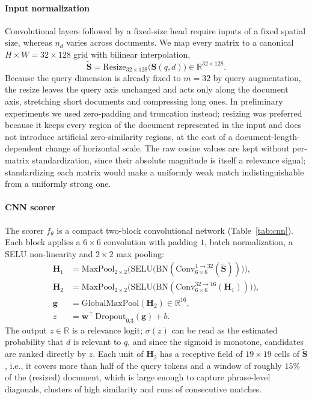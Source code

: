 \documentclass[preprint,5p,times,twocolumn,authoryear]{elsarticle}
\begin{document}
\paragraph{Input normalization}
Convolutional layers followed by a fixed-size head require inputs of a fixed spatial size, whereas $n_d$ varies across documents. We map every matrix to a canonical $H\times W = 32\times128$ grid with bilinear interpolation,
\begin{equation}
\tilde{\mathbf{S}} = \mathrm{Resize}_{32\times128}\big(\mathbf{S}(q,d)\big) \in \mathbb{R}^{32\times128}.
\label{eq:resize}
\end{equation}
Because the query dimension is already fixed to $m=32$ by query augmentation, the resize leaves the query axis unchanged and acts only along the document axis, stretching short documents and compressing long ones. In preliminary experiments we used zero-padding and truncation instead; resizing was preferred because it keeps every region of the document represented in the input and does not introduce artificial zero-similarity regions, at the cost of a document-length-dependent change of horizontal scale. The raw cosine values are kept without per-matrix standardization, since their absolute magnitude is itself a relevance signal; standardizing each matrix would make a uniformly weak match indistinguishable from a uniformly strong one.

\paragraph{CNN scorer}
The scorer $f_\theta$ is a compact two-block convolutional network (Table~\ref{tab:cnn}). Each block applies a $6\times6$ convolution with padding $1$, batch normalization, a SELU non-linearity and $2\times2$ max pooling:
\begin{align}
\mathbf{H}_1 &= \mathrm{MaxPool}_{2\times2}\Big(\mathrm{SELU}\big(\mathrm{BN}(\mathrm{Conv}^{1\rightarrow32}_{6\times6}(\tilde{\mathbf{S}}))\big)\Big), \\
\mathbf{H}_2 &= \mathrm{MaxPool}_{2\times2}\Big(\mathrm{SELU}\big(\mathrm{BN}(\mathrm{Conv}^{32\rightarrow16}_{6\times6}(\mathbf{H}_1))\big)\Big), \\
\mathbf{g} &= \mathrm{GlobalMaxPool}(\mathbf{H}_2)\in\mathbb{R}^{16}, \\
z &= \mathbf{w}^{\top}\,\mathrm{Dropout}_{0.3}(\mathbf{g}) + b .
\end{align}
The output $z\in\mathbb{R}$ is a relevance logit; $\sigma(z)$ can be read as the estimated probability that $d$ is relevant to $q$, and since the sigmoid is monotone, candidates are ranked directly by $z$. Each unit of $\mathbf{H}_2$ has a receptive field of $19\times19$ cells of $\tilde{\mathbf{S}}$, i.e., it covers more than half of the query tokens and a window of roughly $15\%$ of the (resized) document, which is large enough to capture phrase-level diagonals, clusters of high similarity and runs of consecutive matches.
\end{document}
